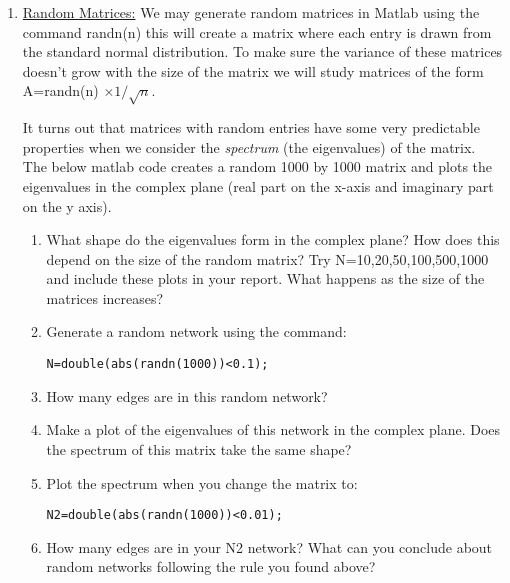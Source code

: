 \documentclass[11pt, a4paper]{article}
\begin{document}
\begin{enumerate}
\item \underline{Random Matrices:} We may generate random matrices in Matlab using the command randn(n) this will create a matrix where each entry is drawn from the standard normal distribution. To make sure the variance of these matrices doesn't grow with the size of the matrix we will study matrices of the form A=randn(n) $\times 1/\sqrt{n}$. 

It turns out that matrices with random entries have some very predictable properties when we consider the \textit{spectrum} (the eigenvalues) of the matrix. The below matlab code creates a random 1000 by 1000 matrix and plots the eigenvalues in the complex plane (real part on the x-axis and imaginary part on the y axis). 



\begin{enumerate}
\item What shape do the eigenvalues form in the complex plane? How does this depend on the size of the random matrix? Try N=10,20,50,100,500,1000 and include these plots in your report.  What happens as the size of the matrices increases?
\item Generate a random network using the command:
\begin{lstlisting}
N=double(abs(randn(1000))<0.1);
\end{lstlisting}
\item How many edges are in this random network?
\item Make a plot of the eigenvalues of this network in the complex plane. Does the spectrum of this matrix take the same shape?
\item Plot the spectrum when you change the matrix to:
\begin{lstlisting}
N2=double(abs(randn(1000))<0.01);
\end{lstlisting}
\item How many edges are in your N2 network? What can you conclude about random networks following the rule you found above?
\end{enumerate}





\end{enumerate}


\end{document}
